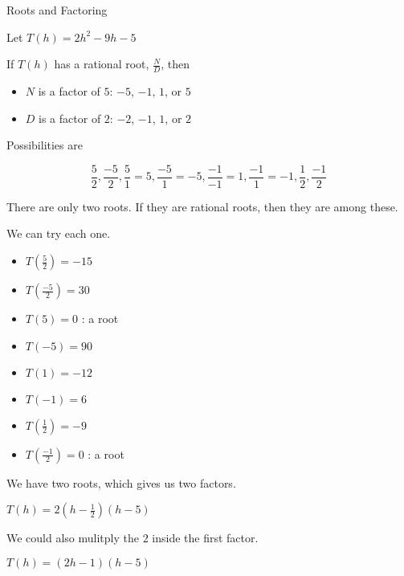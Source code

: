 \documentclass{ximera}
\begin{document}
\begin{example}  Roots and Factoring


Let $T(h) = 2 h^2 - 9h - 5$



If $T(h)$ has a rational root, $\frac{N}{D}$, then


\begin{itemize}
\item $N$ is a factor of $5$: $-5$, $-1$, $1$, or $5$
\item $D$ is a factor of $2$: $-2$, $-1$, $1$, or $2$
\end{itemize}



Possibilities are 

\[  \frac{5}{2}, \frac{-5}{2}, \frac{5}{1}=5, \frac{-5}{1}=-5, \frac{-1}{-1}=1, \frac{-1}{1}=-1, \frac{1}{2}, \frac{-1}{2}   \]


There are only two roots. If they are rational roots, then they are among these.


We can try each one.



\begin{itemize}
\item $T\left( \frac{5}{2} \right) = -15$
\item $T\left( \frac{-5}{2} \right) = 30$
\item $T(5) = 0$   : a root
\item $T(-5) = 90$
\item $T(1) = -12$   
\item $T(-1) = 6$
\item $T\left( \frac{1}{2} \right) = -9$
\item $T\left( \frac{-1}{2} \right) = 0$ : a root
\end{itemize}

We have two roots, which gives us two factors.


$T(h) = 2\left(h-\frac{1}{2} \right)(h-5)$

We could also mulitply the $2$ inside the first factor.


$T(h) = (2h - 1)(h-5)$



\end{example}
\end{document}
